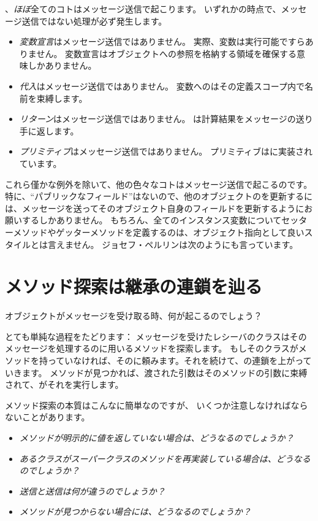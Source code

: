 \documentclass[a4paper,10pt,twoside]{book}
\begin{document}
、\emph{ほぼ}全てのコトはメッセージ送信で起こります。
いずれかの時点で、メッセージ送信ではない処理が必ず発生します。
\begin{itemize}
  \item \emph{変数宣言}はメッセージ送信ではありません。
		実際、変数は実行可能ですらありません。
		変数宣言はオブジェクトへの参照を格納する領域を確保する意味しかありません。
  \item \emph{代入}はメッセージ送信ではありません。
		変数へのはその定義スコープ内で名前を束縛します。
  \item \emph{リターン}はメッセージ送信ではありません。
		は計算結果をメッセージの送り手に返します。
  \item \emph{プリミティブ}はメッセージ送信ではありません。
		プリミティブはに実装されています。
\end{itemize}
これら僅かな例外を除いて、他の色々なコトはメッセージ送信で起こるのです。
特に、``パブリックなフィールド''はないので、他のオブジェクトのを更新するには、メッセージを送ってそのオブジェクト自身のフィールドを更新するようにお願いするしかありません。
もちろん、全てのインスタンス変数についてセッターメソッドやゲッターメソッドを定義するのは、オブジェクト指向として良いスタイルとは言えません。
ジョセフ・ペルリンは次のようにも言っています。

\section{メソッド探索は継承の連鎖を辿る}


オブジェクトがメッセージを受け取る時、何が起こるのでしょう？

とても単純な過程をたどります：
メッセージを受けたレシーバのクラスはそのメッセージを処理するのに用いるメソッドを探索します。
もしそのクラスがメソッドを持っていなければ、そのに頼みます。それを続けて、の連鎖を上がっていきます。
メソッドが見つかれば、渡された引数はそのメソッドの引数に束縛されて、がそれを実行します。

メソッド探索の本質はこんなに簡単なのですが、
いくつか注意しなければならないことがあります。

\begin{itemize}
  \item \emph{メソッドが明示的に値を返していない場合は、どうなるのでしょうか？}
  \item \emph{あるクラスがスーパークラスのメソッドを再実装している場合は、どうなるのでしょうか？}
  \item \emph{送信と送信は何が違うのでしょうか？}
  \item \emph{メソッドが見つからない場合には、どうなるのでしょうか？}
\end{itemize}
\end{document}
